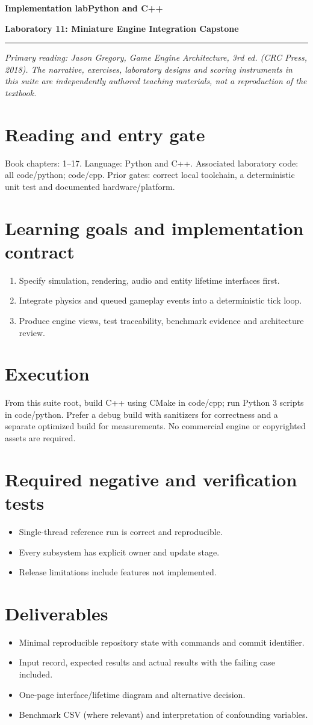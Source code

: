 \documentclass[11pt,letterpaper]{article}
\newcommand{\DocType}{Reference}
\newcommand{\SuiteHeading}[3]{%
\renewcommand{\DocType}{#2}%
{\small\bfseries\sffamily\color{EngineTeal}#2\hfill #3}\par\vspace{6pt}
{\LARGE\bfseries\color{EngineBlue}#1}\par\vspace{4pt}
{\color{EngineTeal}\rule{\linewidth}{1pt}}\par\vspace{7pt}}
\newcommand{\SourceNote}{\footnotesize\textit{Primary reading: Jason Gregory, \emph{Game Engine Architecture}, 3rd ed. (CRC Press, 2018). The narrative, exercises, laboratory designs and scoring instruments in this suite are independently authored teaching materials, not a reproduction of the textbook.}\normalsize\par}
\begin{document}
\SuiteHeading{Laboratory 11: Miniature Engine Integration Capstone}{Implementation lab}{Python and C++}
\SourceNote
\section{Reading and entry gate}
Book chapters: 1–17. Language: Python and C++. Associated laboratory code: all code/python; code/cpp. Prior gates: correct local toolchain, a deterministic unit test and documented hardware/platform.

\section{Learning goals and implementation contract}
\begin{enumerate}
\item Specify simulation, rendering, audio and entity lifetime interfaces first.
\item Integrate physics and queued gameplay events into a deterministic tick loop.
\item Produce engine views, test traceability, benchmark evidence and architecture review.
\end{enumerate}
\section{Execution}
From this suite root, build C++ using CMake in code/cpp; run Python 3 scripts in code/python. Prefer a debug build with sanitizers for correctness and a separate optimized build for measurements. No commercial engine or copyrighted assets are required.

\section{Required negative and verification tests}
\begin{itemize}
\item Single-thread reference run is correct and reproducible.
\item Every subsystem has explicit owner and update stage.
\item Release limitations include features not implemented.
\end{itemize}
\section{Deliverables}
\begin{itemize}
\item Minimal reproducible repository state with commands and commit identifier.
\item Input record, expected results and actual results with the failing case included.
\item One-page interface/lifetime diagram and alternative decision.
\item Benchmark CSV (where relevant) and interpretation of confounding variables.
\end{itemize}
\end{document}
